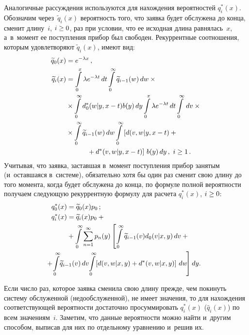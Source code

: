 \begin{multicols}{2}
Аналогичные рассуждения используются для нахождения вероятностей
$q_i^*(x)$. Обозначим через~$\widetilde{q}_i(x)$ вероятность того,
что заявка будет обслужена до конца, сменит длину~$i$, $i\hm\ge0$, раз
при условии, что ее исходная длина равнялась~$x$, а~в~момент ее
поступления прибор был свободен. Рекуррентные соотношения, которым
удовлетворяют $\widetilde{q}_i(x)$, имеют вид:
\begin{align*}
\widetilde{q}_0(x)&=e^{-\la x}\,,
\\
\widetilde{q}_i(x)&= \int\limits_0^x \la e^{-\la t}\,dt
\int\limits_0^\infty \widetilde{q}_{i-1}(w) \, dw\times{}\\
&{}\times
\int\limits_0^\infty d^*_0(w|y,x-t) b(y)\, dy
\int\limits_0^x \la e^{-\la t}\,dt
\int\limits_0^\infty \, dv\times{}\\
&{}\times
\int\limits_0^\infty \widetilde{q}_{i-1}(w) \, dw
\int\limits_0^\infty \left[ \vphantom{d^*}
d(v,w|y,x-t)+{}\right.\\
&\hspace*{10mm}\left.{}+d^*(v,w|y,x-t)\right]\, b(y)\, dy
\,, \ i \ge 1\,.
\end{align*}
Учитывая, что заявка,
заставшая в~момент поступления прибор занятым (и~оставшаяся в~системе),
обязательно хотя бы один раз сменит свою длину
до того момента, когда будет обслужена до конца,
по формуле полной вероятности получаем следующую рекуррентную формулу для расчета
$q^*_i(x)$, $i\hm\ge0$:
\begin{align*}
{q_0^*(x)}&=
\widetilde{q}_0(x) p_0\,;
\\
{q_i^*(x)}&= \widetilde{q}_i(x) p_0+{}\\
&{}+
\int\limits_0^\infty
\sum\limits_{n=1}^\infty p_n(y)
\left [
\int\limits_0^\infty \widetilde{q}_{i-1}(v)d_0(v|x,y)\,dv
+{}\right.
\\
&\hspace*{-12mm}\left. {}+\!
\int\limits_0^\infty \!\widetilde{q}_{i-1}(v)\,dv
\!\int\limits_0^\infty \!\left[d(v,w|x,y)+d^*(v,w|x,y)\right]\,dw\!
\right]dy.
\end{align*}

Если число раз, которое заявка сменила свою длину
прежде, чем покинуть систему обслуженной (недообслуженной),
не имеет значения, то для нахождения соответствующей вероятности достаточно
просуммировать $q_i^*(x)$ (${\widehat{q}_i(x)}$) по всем значениям~$i$.
Заметим, что данные вероятности можно найти и~другим способом, выписав для них по отдельному уравнению и~решив их.


\end{multicols}
